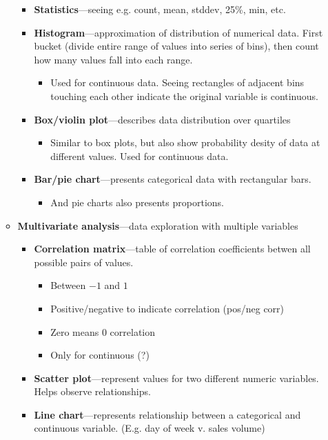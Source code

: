 \begin{multicols}{2}
\begin{itemize}
\begin{itemize}
    \begin{itemize}
        \item
      \textbf{Statistics}---seeing e.g. count, mean, stddev, 25\%, min,
      etc.
    \item
      \textbf{Histogram}---approximation of distribution of numerical
      data. First bucket (divide entire range of values into series of
      bins), then count how many values fall into each range.

      \begin{itemize}
            \item
        Used for continuous data. Seeing rectangles of adjacent bins
        touching each other indicate the original variable is
        continuous.
      \end{itemize}
    \item
      \textbf{Box/violin plot}---describes data distribution over
      quartiles

      \begin{itemize}
            \item
        Similar to box plots, but also show probability desity of data
        at different values. Used for continuous data.
      \end{itemize}
    \item
      \textbf{Bar/pie chart}---presents categorical data with
      rectangular bars.

      \begin{itemize}
            \item
        And pie charts also presents proportions.
      \end{itemize}
    \end{itemize}
  \item
    \textbf{Multivariate analysis}---data exploration with multiple
    variables

    \begin{itemize}
        \item
      \textbf{Correlation matrix}---table of correlation coefficients
      betwen all possible pairs of values.

      \begin{itemize}
            \item
        Between {\(- 1\)} and {\(1\)}
      \item
        Positive/negative to indicate correlation (pos/neg corr)
      \item
        Zero means 0 correlation
      \item
        Only for continuous (?)
      \end{itemize}
    \item
      \textbf{Scatter plot}---represent values for two different numeric
      variables. Helps observe relationships.
    \item
      \textbf{Line chart}---represents relationship between a
      categorical and continuous variable. (E.g. day of week v. sales
      volume)
    \end{itemize}
  \end{itemize}
\end{itemize}
\end{multicols}